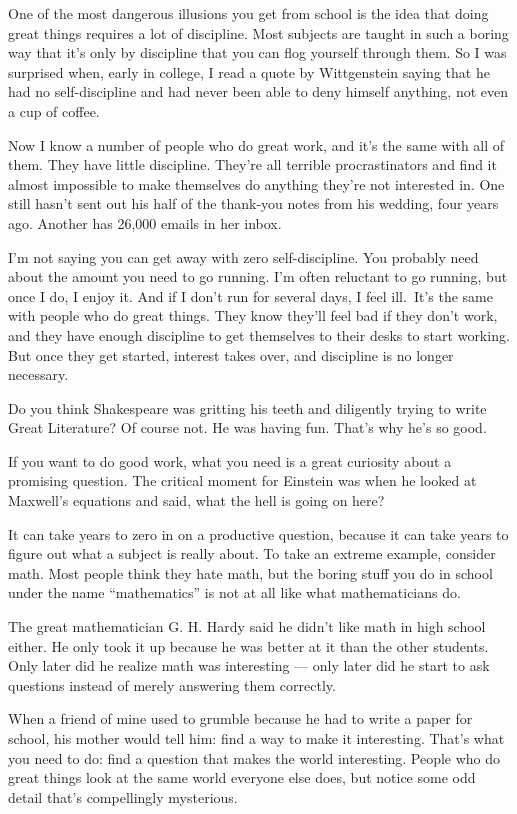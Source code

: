\documentclass[12pt]{book}
\begin{document}
One of the most dangerous illusions you get from school is the idea that
doing great things requires a lot of discipline. Most subjects are
taught in such a boring way that it's only by discipline that you can
flog yourself through them. So I was surprised when, early in college, I
read a quote by Wittgenstein saying that he had no self-discipline and
had never been able to deny himself anything, not even a cup of coffee.

Now I know a number of people who do great work, and it's the same with
all of them. They have little discipline. They're all terrible
procrastinators and find it almost impossible to make themselves do
anything they're not interested in. One still hasn't sent out his half
of the thank-you notes from his wedding, four years ago. Another has
26,000 emails in her inbox.

I'm not saying you can get away with zero self-discipline. You probably
need about the amount you need to go running. I'm often reluctant to go
running, but once I do, I enjoy it. And if I don't run for several days,
I feel ill.~It's the same with people who do great things. They know
they'll feel bad if they don't work, and they have enough discipline to
get themselves to their desks to start working. But once they get
started, interest takes over, and discipline is no longer necessary.

Do you think Shakespeare was gritting his teeth and diligently trying to
write Great Literature? Of course not. He was having fun. That's why
he's so good.

If you want to do good work, what you need is a great curiosity about a
promising question. The critical moment for Einstein was when he looked
at Maxwell's equations and said, what the hell is going on here?

It can take years to zero in on a productive question, because it can
take years to figure out what a subject is really about. To take an
extreme example, consider math. Most people think they hate math, but
the boring stuff you do in school under the name ``mathematics'' is not
at all like what mathematicians do.

The great mathematician G. H. Hardy said he didn't like math in high
school either. He only took it up because he was better at it than the
other students. Only later did he realize math was interesting --- only
later did he start to ask questions instead of merely answering them
correctly.

When a friend of mine used to grumble because he had to write a paper
for school, his mother would tell him: find a way to make it
interesting. That's what you need to do: find a question that makes the
world interesting. People who do great things look at the same world
everyone else does, but notice some odd detail that's compellingly
mysterious.
\end{document}
